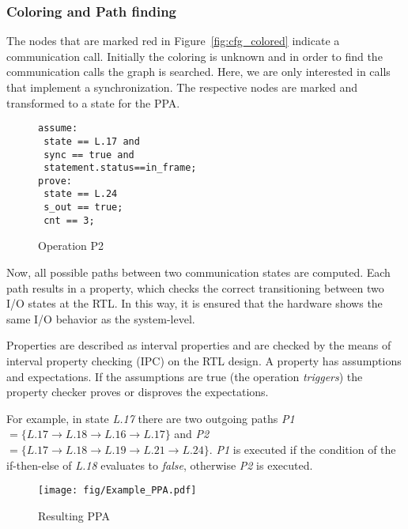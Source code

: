 \subsubsection{Coloring and Path finding}

The nodes that are marked red in Figure~\ref{fig:cfg_colored} indicate a communication call. 
Initially the coloring is unknown and in order to find the communication calls the graph is searched. 
Here, we are only interested in calls that implement a synchronization.
The respective nodes are marked and transformed to a state for the PPA. 

\begin{wrapfigure}{r}{0.25\textwidth}
			\vspace{-20pt}
		\caption{Operation P2}
		\label{fig:example_operation}
		\begin{small}
		\begin{lstlisting}
assume:
 state == L.17 and
 sync == true and 	
 statement.status==in_frame;
prove: 
 state == L.24
 s_out == true;
 cnt == 3;
\end{lstlisting}
\end{small}
\end{wrapfigure}

Now, all possible paths between two communication states are computed.
Each path results in a property, which checks the correct transitioning between two I/O states at the RTL. 
In this way, it is ensured that the hardware shows the same I/O behavior as the system-level.

Properties are described as interval properties and are checked by the means of interval property checking (IPC) on the RTL design. 
A property has assumptions and expectations. 
If the assumptions are true (the operation \textit{triggers}) the property checker proves or disproves the expectations. 

For example, in state \textit{L.17} there are two outgoing paths \textit{P1}$=\{L.17\rightarrow L.18\rightarrow L.16\rightarrow L.17\}$ 
and \textit{P2}$=\{L.17\rightarrow L.18\rightarrow L.19\rightarrow L.21\rightarrow L.24\}$. 
\textit{P1} is executed if the condition of the if-then-else of \textit{L.18} evaluates to \textit{false}, otherwise \textit{P2} is executed. 
\begin{wrapfigure}{L}{0.25\textwidth}
	\vspace{-20pt}
    \caption{Resulting PPA}
    \label{fig:example_PPA}
    \texttt{[image: fig/Example\_PPA.pdf]}
\end{wrapfigure}

